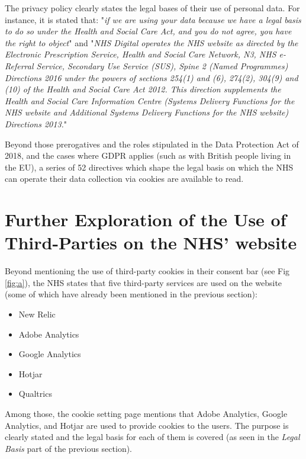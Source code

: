 \documentclass[twocolumn, letterpaper,13pt]{scrartcl}
\begin{document}
        The privacy policy clearly states the legal bases of their use of personal data. For instance, it is stated that: "\textit{if we are using your data because we have a legal basis to do so under the Health and Social Care Act, and you do not agree, you have the right to object}" and "\textit{NHS Digital operates the NHS website as directed by the Electronic Prescription Service, Health and Social Care Network, N3, NHS e-Referral Service, Secondary Use Service (SUS), Spine 2 (Named Programmes) Directions 2016 under the powers of sections 254(1) and (6), 274(2), 304(9) and (10) of the Health and Social Care Act 2012. This direction supplements the Health and Social Care Information Centre (Systems Delivery Functions for the NHS website and Additional Systems Delivery Functions for the NHS website) Directions 2013.}"
        
        Beyond those prerogatives and the roles stipulated in the Data Protection Act of 2018, and the cases where GDPR applies (such as with British people living in the EU), a series of 52 directives\cite{directives} which shape the legal basis on which the NHS can operate their data collection via cookies are available to read.
        
    \section{Further Exploration of the Use of Third-Parties on the NHS' website}
	
	    Beyond mentioning the use of third-party cookies in their consent bar (see Fig \ref{fig:a}), the NHS states that five third-party services are used on the website (some of which have already been mentioned in the previous section):
	    \begin{itemize}
        \item New Relic
        \item Adobe Analytics
        \item Google Analytics
        \item Hotjar
        \item Qualtrics
        \end{itemize}
        
        Among those, the cookie setting page\cite{cookiesettings} mentions that Adobe Analytics, Google Analytics, and Hotjar are used to provide cookies to the users. The purpose is clearly stated and the legal basis for each of them is covered (as seen in the \textit{Legal Basis} part of the previous section).
        
\end{document}
